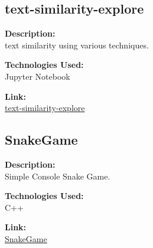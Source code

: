 \documentclass[a4paper,10pt]{article}
\begin{document}
\subsection*{text-similarity-explore}

\noindent
\begin{minipage}[t]{0.4\textwidth}
  \textbf{Description:}\\
  text similarity using various techniques.
\end{minipage}%
\begin{minipage}[t]{0.4\textwidth}
  \textbf{Technologies Used:}\\
  Jupyter Notebook
\end{minipage}%
\begin{minipage}[t]{0.2\textwidth}
  \textbf{Link:}\\
  \href{https://github.com/EchoSingh/text-similarity-explorer}{text-similarity-explore}
\end{minipage}

\subsection*{SnakeGame}

\noindent
\begin{minipage}[t]{0.4\textwidth}
  \textbf{Description:}\\
  Simple Console Snake Game.
\end{minipage}%
\begin{minipage}[t]{0.4\textwidth}
  \textbf{Technologies Used:}\\
  C++
\end{minipage}%
\begin{minipage}[t]{0.2\textwidth}
  \textbf{Link:}\\
  \href{https://github.com/EchoSingh/SnakeGame}{SnakeGame}
\end{minipage}
\end{document}
